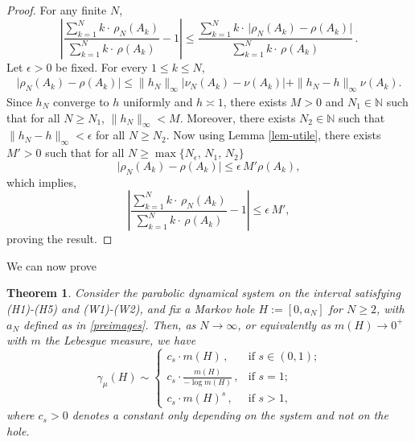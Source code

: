 \documentclass{amsart}
\newtheorem{theorem}{Theorem}[section]
\theoremstyle{definition}
\theoremstyle{remark}
\theoremstyle{definition}
\numberwithin{equation}{section}
\newcommand{\N}{\mathbb N}
\begin{document}
\begin{proof}
    For any finite $N$, 
    \[
    \left| \frac{\sum\limits_{k=1}^{N} k \cdot \, \rho_{N}(A_{k})}{\sum\limits_{k=1}^{N} k \cdot \, \rho(A_{k})} -1 \right| \le \frac{\sum\limits_{k=1}^{N} k \cdot \, \Big|\rho_{N}(A_{k}) - \rho(A_{k}) \Big|}{ \sum\limits_{k=1}^{N} k \cdot \, \rho(A_{k})}\, .
    \]
    Let $\epsilon> 0$ be fixed. For every $1 \le k \le N$,
    \begin{eqnarray*}
        \Big|\rho_{N}(A_{k}) - \rho(A_{k}) \Big| \le \| h_{N} \|_{\infty} \big|\nu_{N}(A_{k}) - \nu(A_{k}) \big| +  \| h_{N} - h \|_{\infty} \nu(A_{k}).
    \end{eqnarray*}
    Since $h_{N}$ converge to $h$ uniformly and $h \asymp 1$, there exists $M > 0$ and $N_{1} \in \N$ such that for all $N \ge N_{1}$, $\|h_{N}\|_{\infty} < M$. Moreover, there exists $N_{2} \in \N$ such that $\|h_{N} - h\|_{\infty} < \epsilon$ for all $N \ge N_{2}$. Now using Lemma \ref{lem-utile}, there exists $M' > 0$ such that for all $N \ge \max\{N_{\epsilon},\,  N_{1}, \, N_{2}  \}$
    \[
        \Big|\rho_{N}(A_{k}) - \rho(A_{k}) \Big| \le  \epsilon \,   M' \rho(A_{k}),
    \]
which implies,
    \[
         \left| \frac{\sum\limits_{k=1}^{N} k \cdot \, \rho_{N}(A_{k})}{\sum\limits_{k=1}^{N} k \cdot \, \rho(A_{k})} -1 \right| \le \epsilon \,   M' ,
    \]
proving the result.
\end{proof}

We can now prove

\begin{theorem}\label{thm:shrinking}
Consider the parabolic dynamical system on the interval satisfying (H1)-(H5) and (W1)-(W2), and fix a Markov hole $H:=[0,a_N]$ for $N \ge 2$, with $a_N$ defined as in \eqref{preimages}. Then, as $N\to \infty$, or equivalently as $m(H)\to 0^+$ with $m$ the Lebesgue measure, we have
\begin{equation}\label{final-formula}
\gamma_\mu(H) \sim \left\{ \begin{array}{ll} c_s \cdot m(H)\, , & \text{if $s\in (0,1)$;}\\[0.2cm] c_s \cdot \frac{m(H)}{-\log m(H)}\, , & \text{if $s=1$;}\\[0.2cm] c_s \cdot m(H)^s\, , & \text{if $s>1$,} \end{array} \right.
\end{equation}
where $c_s>0$ denotes a constant only depending on the system and not on the hole.
\end{theorem}
\end{document}
